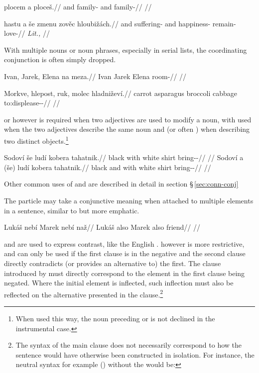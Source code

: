 \pex
\begingl
     plocem {a} ploceš.//
    \glb and family-\First{}\Sg{} and family-\Second{}\Sg{}//
    \glft {}//
\endgl
\xe

\pex
\begingl
     hastu {a} še zmenu zověc hloubižách.//
    \glb and suffering-\mk{} and \Com{} happiness-\Ins{} remain-\Cv{} love-//
    \glft {} \emph{Lit.,} //
\endgl
\xe

With multiple nouns or noun phrases, especially in serial lists, the
coordinating conjunction is often simply dropped.

\pex
\begingl
    \gla Ivan, Jarek, Elena na meza.//
    \glb Ivan Jarek Elena \Loc{} room-\Acc{}//
    \glft {}//
\endgl
\xe

\pex
\begingl
    \gla Morkve, hlepost, ruk, molec hladniževí.//
    \glb carrot asparagus broccoli cabbage to:displease-\Av{}-\Cont{}//
    \glft {}//
\endgl
\xe

 or  however is required when two adjectives are used to modify a
noun, with  used when the two adjectives describe the same noun and
 (or often ) when describing two distinct
objects.\footnote{When used this way, the noun preceding  or 
is not declined in the instrumental case.}

\pex
\a
\begingl
    \gla Sodoví {še} ludí kobera tahatnik.//
    \glb black with white shirt bring-\Pv{}-\Pf{}//
    \glft {}//
\endgl
\a
\begingl
    \gla Sodoví {a} {(še)} ludí kobera tahatnik.//
    \glb black and with white shirt bring-\Pv{}-\Pf{}//
    \glft {}//
\endgl
\xe

Other common uses of  and  are described in detail in section
\S\,\ref{sec:conn-conj}

The particle  may take a conjunctive meaning when attached to
multiple elements in a sentence, similar to  but more emphatic.

\pex
\begingl
    \gla Lukáš nebí Marek nebí naž//
    \glb Lukáš also Marek also friend//
    \glft {}//
\endgl
\xe

 and  are used to express contrast, like the English
.  however is more restrictive, and can only be used if the
first clause is in the negative and the second clause directly contradicts (or
provides an alternative to) the first. The clause introduced by  must
directly correspond to the element in the first clause being negated. Where the
initial element is inflected, such inflection must also be reflected on the
alternative presented in the  clause.\footnote{The syntax of the main
clause does not necessarily correspond to how the sentence would have otherwise
been constructed in isolation. For instance, the neutral syntax for example
() without the  would be: }

